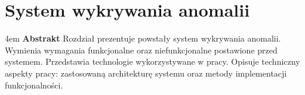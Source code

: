 \chapter{System wykrywania anomalii}

\begingroup
\leftskip4em
\rightskip\leftskip
\noindent
\textbf{Abstrakt} Rozdział prezentuje powstały system wykrywania anomalii. Wymienia wymagania funkcjonalne oraz niefunkcjonalne postawione przed systemem. Przedstawia technologie wykorzystywane w pracy. Opisuje techniczny aspekty pracy: zastosowaną architekturę systemu oraz metody implementacji funkcjonalności. 
\par
\endgroup




